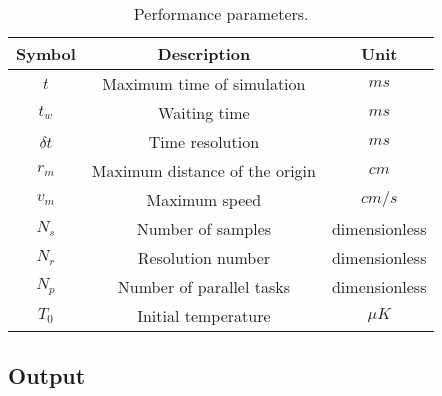 \begin{table}[ht!]
    \centering
    \begin{tabular}{|c|c|c|}
        \hline
        \textbf{Symbol} & \textbf{Description} & \textbf{Unit} \\ \hline
        $ t $ & Maximum time of simulation & $ ms $ \\
        $ t_{w} $ & Waiting time & $ ms $ \\
        $ \delta t $ & Time resolution & $ ms $ \\
        $ r_{m} $ & Maximum distance of the origin & $ cm $ \\
        $ v_{m} $ & Maximum speed & $ cm / s $ \\
        $ N_{s} $ & Number of samples & dimensionless \\
        $ N_{r} $ & Resolution number & dimensionless \\
        $ N_{p} $ & Number of parallel tasks & dimensionless \\
        $ T_0 $ & Initial temperature & $ \mu K $ \\
        \hline
    \end{tabular}
    \caption{Performance parameters.}
    \label{tab:performance-parameters}
\end{table}

\subsection{Output}
\label{sec:output}

